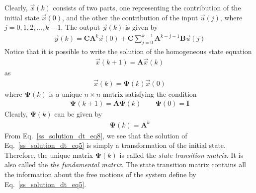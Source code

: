 \documentclass[12pt,a4paper,oneside]{book}
\begin{document}
\begin{onehalfspace}
Clearly, $\vec{x}(k)$ consists of two parts, one representing the contribution 
of the initial state $\vec{x}(0)$, and the other the contribution of the input 
$\vec{u}(j)$, where $j = 0,1,2,...,k-1$. The output $\vec{y}(k)$ is given by
\begin{equation}\label{ss_solution_dt_eq4}
	\begin{aligned}
		\vec{y}(k) = \mathbf{C}\mathbf{A}^k\vec{x}(0) + 
		\mathbf{C}\sum_{j=0}^{k-1}\mathbf{A}^{k-j-1}\mathbf{B}\vec{u}(j)
	\end{aligned}
\end{equation}
Notice that it is possible to write the solution of the homogeneous state 
equation
\begin{equation}\label{ss_solution_dt_eq5}
	\begin{aligned}
		\vec{x}(k+1) = \mathbf{A}\vec{x}(k)
	\end{aligned}
\end{equation}
as 
\begin{equation}\label{ss_solution_dt_eq6}
	\begin{aligned}
		\vec{x}(k) = \mathbf{\Psi}(k)\vec{x}(0)
	\end{aligned}
\end{equation}
where $\mathbf{\Psi}(k)$ is a unique $n \times n$ matrix satisfying the 
condition
\begin{equation}\label{ss_solution_dt_eq7}
	\begin{aligned}
		\mathbf{\Psi}(k+1) = \mathbf{A}\mathbf{\Psi}(k) \quad \quad 
		\mathbf{\Psi}(0)=\mathbf{I}
	\end{aligned}
\end{equation}
Clearly, $\mathbf{\Psi}(k)$ can be given by 
\begin{equation}\label{ss_solution_dt_eq8}
	\begin{aligned}
		\mathbf{\Psi}(k) = \mathbf{A}^k
	\end{aligned}
\end{equation}
From Eq.~\eqref{ss_solution_dt_eq8}, we see that the solution of 
Eq.~\eqref{ss_solution_dt_eq5} is simply a 
transformation of the initial state. Therefore, the unique matrix 
$\mathbf{\Psi}(k)$ is called the \textit{state transition matrix}. It is also 
called the \textit{the fundamental matrix}. The state transition matrix 
contains all the information about the free motions of the system define by 
Eq.~\eqref{ss_solution_dt_eq5}.


\end{onehalfspace}
\end{document}
